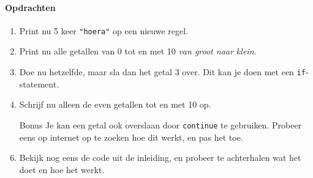 \documentclass[12pt,a4paper]{article}
\newcommand{\icode}{\lstinline}
\begin{document}
\paragraph{Opdrachten}
\begin{enumerate}
	\item
		Print nu 5 keer \icode{"hoera"} op een nieuwe regel.
    \item 
        Print nu alle getallen van 0 tot en met 10 \textit{van groot naar klein}.
	\item
		Doe nu hetzelfde, maar sla dan het getal 3 over. Dit kan je doen met een \icode{if}-statement.
	\item
		Schrijf nu alleen de even getallen tot en met 10 op.
	\item[Bonus] 
		Je kan een getal ook overslaan door \icode{continue} te gebruiken.
		Probeer eens op internet op te zoeken hoe dit werkt, en pas het toe.
	\item
		Bekijk nog eens de code uit de inleiding, en probeer te achterhalen wat het doet en hoe het werkt.
\end{enumerate}

\clearpage
\clearpage
\end{document}
